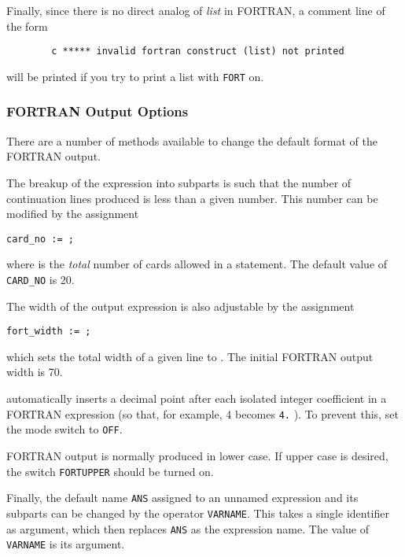 Finally, since there is no direct analog of {\em list\/} in FORTRAN,
a comment line of the form
\begin{verbatim}
        c ***** invalid fortran construct (list) not printed
\end{verbatim}
will be printed if you try to print a list with \texttt{FORT} on.

\subsubsection{{FORTRAN} Output Options}
\hypertarget{reserved:FORT_WIDTH}{}
\hypertarget{switch:PERIOD}{}
\hypertarget{switch:FORTUPPER}{}

There are a number of methods available to change the default format of the
FORTRAN output.

The breakup of the expression into subparts is such that the number of
continuation lines produced is less than a given number. This number can
be modified by the assignment
\begin{syntax}
        \texttt{card\_no := }\texttt{;}
\end{syntax}
where  is the \emph{total} number of cards allowed in a
statement. The default value of \texttt{CARD\_NO} is 20.

The width of the output expression is also adjustable by the assignment
\begin{syntax}
        \texttt{fort\_width := }\texttt{;}
\end{syntax}
 which sets the total width of a given line to
.  The initial FORTRAN output width is 70.

{\REDUCE} automatically inserts a decimal point after each isolated integer
coefficient in a FORTRAN expression (so that, for example, 4 becomes
\texttt{4.} ). To prevent this, set the 
mode switch to \texttt{OFF}.

FORTRAN output is normally produced in lower case.  If upper case is desired,
the switch \texttt{FORTUPPER} should be turned on.

\hypertarget{operator:VARNAME}{}
Finally, the default name \texttt{ANS} assigned to an unnamed expression and
its subparts can be changed by the operator \texttt{VARNAME}.
  This takes a single identifier as argument, which then
replaces \texttt{ANS} as the expression name.  The value of \texttt{VARNAME} is
its argument.

